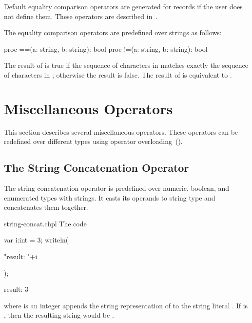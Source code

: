 Default equality comparison operators are generated for records if the
user does not define them.  These operators are described
in~.

The equality comparison operators are predefined over strings as
follows:
\begin{chapel}
proc ==(a: string, b: string): bool
proc !=(a: string, b: string): bool
\end{chapel}
The result of  is true if the sequence of characters
in  matches exactly the sequence of characters in ;
otherwise the result is false.  The result of  is
equivalent to .

\section{Miscellaneous Operators}
\label{Miscellaneous_Operators}

This section describes several miscellaneous operators.  These
operators can be redefined over different types using operator
overloading~().

\subsection{The String Concatenation Operator}
\label{The_String_Concatenation_Operator}

The string concatenation operator \chpl{+} is predefined over numeric, boolean,
and enumerated types with strings. It casts its operands to string type and
concatenates them together.

\begin{chapelexample}{string-concat.chpl}
The code
\begin{chapelnoprint}
var i:int = 3;
writeln(
\end{chapelnoprint}
\begin{chapel}
"result: "+i
\end{chapel}
\begin{chapelnoprint}
);
\end{chapelnoprint}
\begin{chapeloutput}
result: 3
\end{chapeloutput}
where  is an integer appends the string representation of  to the
string literal .  If  is , then the resulting string
would be .
\begin{chapelnoprint}
\end{chapelnoprint}
\end{chapelexample}

